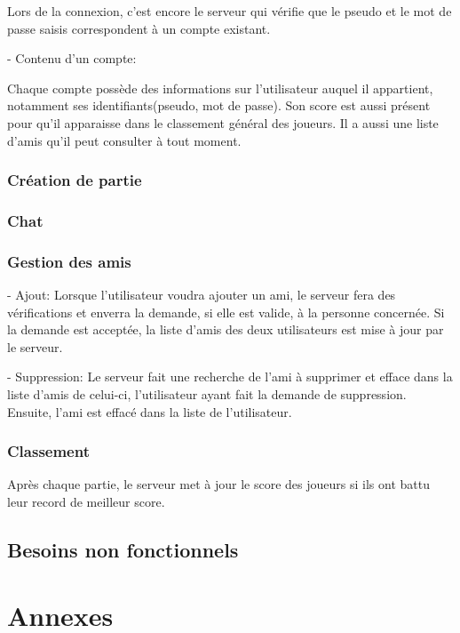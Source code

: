 \documentclass[a4paper,12pt]{article}
\begin{document}
Lors de la connexion, c'est encore le serveur qui vérifie que le pseudo et le mot de passe saisis correspondent à un compte existant.

- Contenu d'un compte:

Chaque compte possède des informations sur l'utilisateur auquel il appartient, notamment ses identifiants(pseudo, mot de passe). Son score est aussi présent pour qu'il apparaisse dans le classement général des joueurs. Il a aussi une liste d'amis qu'il peut consulter à tout moment.

\subsubsection{Création de partie}


\subsubsection{Chat}


\subsubsection{Gestion des amis}

- Ajout: Lorsque l'utilisateur voudra ajouter un ami, le serveur fera des vérifications et enverra la demande, si elle est valide, à la personne concernée. Si la demande est acceptée, la liste d'amis des deux utilisateurs est mise à jour par le serveur.

- Suppression: Le serveur fait une recherche de l'ami à supprimer et efface dans la liste d'amis de celui-ci, l'utilisateur ayant fait la demande de suppression. Ensuite, l'ami est effacé dans la liste de l'utilisateur.


\subsubsection{Classement}

Après chaque partie, le serveur met à jour le score des joueurs si ils ont battu leur record de meilleur score.

\subsection{Besoins non fonctionnels}

\newpage
\section{Annexes}
\end{document}
